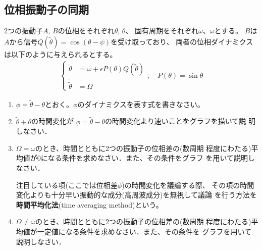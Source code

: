 \documentclass[twocolumn,11pt]{jarticle}
\begin{document}
\subsection{位相振動子の同期}
\question
2つの振動子$A$, $B$の位相をそれぞれ$\theta$, $\tilde{\theta}$、
固有周期をそれぞれ$\omega$、$\omega$とする。
$B$は$A$から信号$Q(\tilde{\theta})=\cos(\theta-\psi)$を受け取っており、
両者の位相ダイナミクスは以下のように与えられるとする。
\begin{align}
  \begin{cases}
  \dot{\theta}&=\omega+\epsilon P(\theta)Q(\tilde{\theta})\\
  \dot{\tilde{\theta}}&=\Omega
  \end{cases},
  \quad P(\theta)=\sin\theta
\end{align}
\begin{enumerate}
\item  $\phi=\tilde{\theta}-\theta$とおく。$\phi$のダイナミクスを表す式を書きなさい。
\item $\tilde{\theta}+\theta$の時間変化が
  $\phi=\tilde{\theta}-\theta$の時間変化より速いことをグラフを描いて説
  明しなさい．
\item $\Omega=\omega$のとき、時間とともに2つの振動子の位相差の(数周期
  程度にわたる)平均値が0になる条件を求めなさい．また、その条件をグラフ
  を用いて説明しなさい．

  \comment 注目している項(ここでは位相差$\phi$)の時間変化を議論する際、
  その項の時間変化よりも十分早い振動的な成分(高周波成分)を無視して議論
  を行う方法を\textbf{時間平均化法}(time averaging method)という。
\item $\Omega\ne\omega$のとき、時間とともに2つの振動子の位相差の(数周期
  程度にわたる)平均値が一定値になる条件を求めなさい．また、その条件を
  グラフを用いて説明しなさい．
\end{enumerate}
\end{document}
